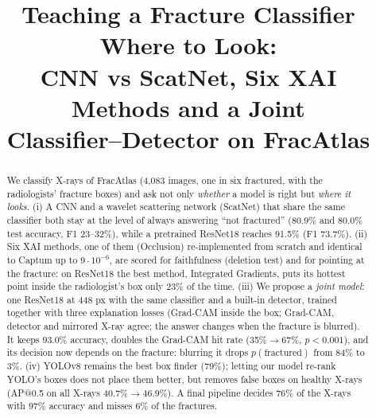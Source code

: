 \documentclass[conference]{IEEEtran}
\begin{document}
\title{Teaching a Fracture Classifier Where to Look:\\
CNN vs ScatNet, Six XAI Methods and a Joint\\
Classifier--Detector on FracAtlas}

\author{
\and
{}
}

\maketitle

\begin{abstract}
We classify X-rays of FracAtlas (4,083 images, one in six fractured, with the radiologists' fracture boxes) and ask
not only \emph{whether} a model is right but \emph{where it looks}. (i) A CNN and a wavelet scattering network
(ScatNet) that share the same classifier both stay at the level of always answering ``not fractured'' (80.9\% and
80.0\% test accuracy, F1 23--32\%), while a pretrained ResNet18 reaches 91.5\% (F1 73.7\%). (ii) Six XAI methods, one
of them (Occlusion) re-implemented from scratch and identical to Captum up to $9\cdot10^{-6}$, are scored for
faithfulness (deletion test) and for pointing at the fracture: on ResNet18 the best method, Integrated Gradients,
puts its hottest point inside the radiologist's box only 23\% of the time. (iii) We propose a \emph{joint model}:
one ResNet18 at 448 px with the same classifier and a built-in detector, trained together with three explanation
losses (Grad-CAM inside the box; Grad-CAM, detector and mirrored X-ray agree; the answer changes when the fracture is
blurred). It keeps 93.0\% accuracy, doubles the Grad-CAM hit rate (35\%$\to$67\%, $p<0.001$), and its decision now
depends on the fracture: blurring it drops $p(\text{fractured})$ from 84\% to 3\%. (iv) YOLOv8 remains the best box
finder (79\%); letting our model re-rank YOLO's boxes does not place them better, but removes false boxes on healthy
X-rays (AP@0.5 on all X-rays 40.7\%$\to$46.9\%). A final pipeline decides 76\% of the X-rays with 97\% accuracy and
misses 6\% of the fractures.
\end{abstract}
\end{document}
